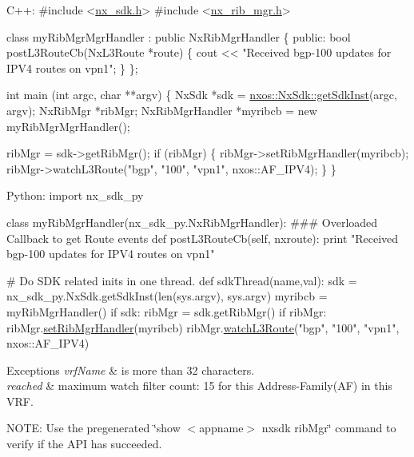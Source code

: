 \begin{DoxyCode}
C++:
\textcolor{preprocessor}{   #include <\mbox{\hyperlink{nx__sdk_8h}{nx\_sdk.h}}>}
\textcolor{preprocessor}{   #include <\mbox{\hyperlink{nx__rib__mgr_8h}{nx\_rib\_mgr.h}}>}

   \textcolor{keyword}{class }myRibMgrMgrHandler : \textcolor{keyword}{public} NxRibMgrHandler \{
      \textcolor{keyword}{public}:
         \textcolor{keywordtype}{bool} postL3RouteCb(NxL3Route *route) \{
              cout << \textcolor{stringliteral}{"Received bgp-100 updates for IPV4 routes on vpn1"};
         \}
   \};

   \textcolor{keywordtype}{int}  main (\textcolor{keywordtype}{int} argc, \textcolor{keywordtype}{char} **argv)
   \{
        NxSdk    *sdk = \mbox{\hyperlink{classnxos_1_1_nx_sdk_a5050e2d26c40744b4fc7862068a83f39}{nxos::NxSdk::getSdkInst}}(argc, argv);
        NxRibMgr *ribMgr;
        NxRibMgrHandler *myribcb = \textcolor{keyword}{new} myRibMgrMgrHandler();

        ribMgr = sdk->getRibMgr();
        \textcolor{keywordflow}{if} (ribMgr) \{
            ribMgr->setRibMgrHandler(myribcb);
            ribMgr->watchL3Route(\textcolor{stringliteral}{"bgp"}, \textcolor{stringliteral}{"100"}, \textcolor{stringliteral}{"vpn1"}, nxos::AF\_IPV4);
        \}
   \}

Python:
   \textcolor{keyword}{import} nx\_sdk\_py

   \textcolor{keyword}{class }myRibMgrHandler(nx\_sdk\_py.NxRibMgrHandler):
\textcolor{preprocessor}{   ### Overloaded Callback to get Route events}
         def postL3RouteCb(self, nxroute):
             print "Received bgp-100 updates for IPV4 routes on vpn1"

\textcolor{preprocessor}{   # Do SDK related inits in one thread.}
   def sdkThread(name,val):
       sdk = nx\_sdk\_py.NxSdk.getSdkInst(len(sys.argv), sys.argv)
       myribcb = myRibMgrHandler()
       if sdk:
          ribMgr = sdk.getRibMgr()
          if ribMgr:
             ribMgr.\mbox{\hyperlink{classnxos_1_1_nx_rib_mgr_ac42dd29e34f9c508614733dbec518b99}{setRibMgrHandler}}(myribcb)
             ribMgr.\mbox{\hyperlink{classnxos_1_1_nx_rib_mgr_ab6749ea02f53fc8b2f6cdba21bbc335d}{watchL3Route}}("bgp", "100", "vpn1", nxos::AF\_IPV4)
\end{DoxyCode}



\begin{DoxyExceptions}{Exceptions}
{\em vrf\+Name} & is more than 32 characters. \\
\hline
{\em reached} & maximum watch filter count\+: 15 for this Address-\/\+Family(AF) in this V\+RF.\\
\hline
\end{DoxyExceptions}
N\+O\+TE\+: Use the pregenerated \char`\"{}show $<$appname$>$ nxsdk rib\+Mgr\char`\"{} command to verify if the A\+PI has succeeded. \mbox{\label{classnxos_1_1_nx_rib_mgr_a35e2a52be337d47cd111803f64aca904}} 
